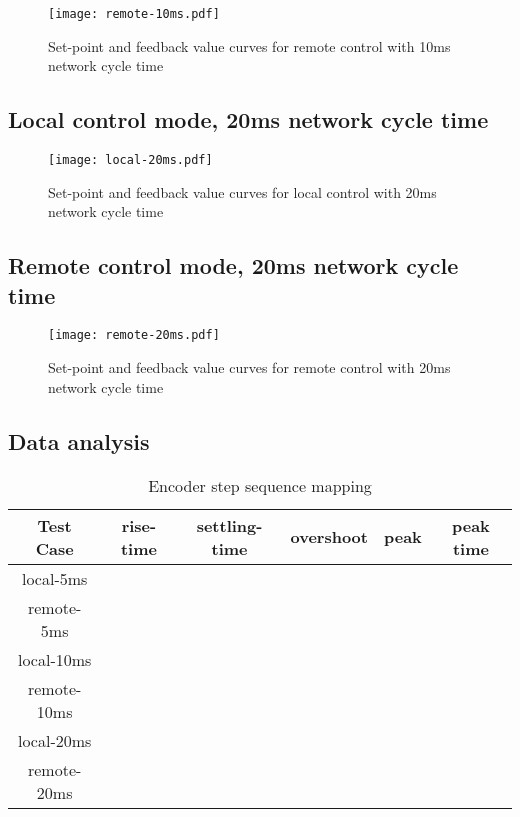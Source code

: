 \begin{figure}[htp]
	\centering
	\texttt{[image: remote-10ms.pdf]}
	\caption{Set-point and feedback value curves for remote control with 10ms network cycle time}
	\label{fig:remote-10ms}
\end{figure}

\subsection{Local control mode, 20ms network cycle time}

\begin{figure}[htp]
	\centering
	\texttt{[image: local-20ms.pdf]}
	\caption{Set-point and feedback value curves for local control with 20ms network cycle time}
	\label{fig:local-20ms}
\end{figure}

\subsection{Remote control mode, 20ms network cycle time}

\begin{figure}[htp]
	\centering
	\texttt{[image: remote-20ms.pdf]}
	\caption{Set-point and feedback value curves for remote control with 20ms network cycle time}
	\label{fig:remote-20ms}
\end{figure}

\subsection{Data analysis}

\begin{table}[htp]
	\centering
	\caption{Encoder step sequence mapping}
	\begin{tabular}{|c|c|c|c|c|c|}
		\hline
		Test Case   & rise-time & settling-time & overshoot & peak & peak time  \\
		\hline
		local-5ms   &           &               &           &      &            \\
		\hline
		remote-5ms  &           &               &           &      &            \\
		\hline
		local-10ms  &           &               &           &      &            \\
		\hline
		remote-10ms &           &               &           &      &            \\
		\hline
		local-20ms  &           &               &           &      &            \\
		\hline
		remote-20ms &           &               &           &      &            \\
		\hline
	\end{tabular}
\end{table}
